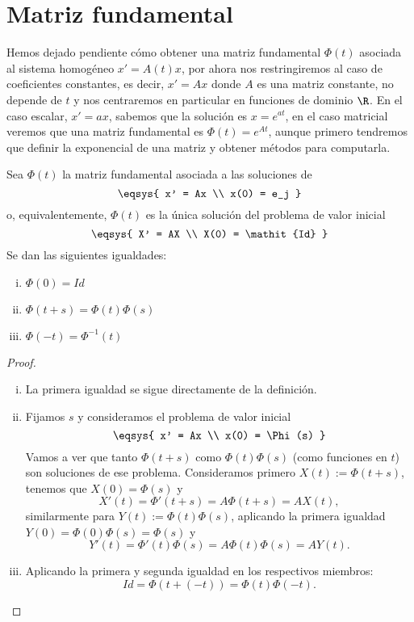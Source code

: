 \documentclass[../main.tex]{subfiles}
\begin{document}
\section{Matriz fundamental}

Hemos dejado pendiente cómo obtener una matriz fundamental \(\Phi(t)\) asociada
al sistema homogéneo \(x' = A(t)x\), por ahora nos restringiremos al caso de
coeficientes constantes, es decir, \(x' = Ax\) donde \(A\) es una matriz
constante, no depende de \(t\) y nos centraremos en particular en funciones de 
dominio \(\R\).  
En el caso escalar, \(x' = ax\), sabemos que la solución es 
\(x = e^{at}\), en el caso matricial veremos que una matriz fundamental es
\(\Phi(t) = e^{At}\), aunque primero tendremos que definir la exponencial de una
matriz y obtener métodos para computarla.

\begin{lemma}
\label{lem:expphi}
	Sea \(\Phi(t)\) la matriz fundamental asociada a las soluciones de
	\[\eqsys{
		x' = Ax \\
		x(0) = e_j
		}\]
	o, equivalentemente, \(\Phi(t)\) es la única solución del problema de valor
	inicial
	\[\eqsys{
		X' = AX \\
		X(0) = \mathit{Id}
		}\]
	Se dan las siguientes igualdades:
	\begin{multicols}{3}
	\begin{enumerate}[i)]
		\item \(\displaystyle \Phi(0) = \mathit{Id}\) 
		\item \(\displaystyle \Phi(t + s) = \Phi(t) \Phi(s)\) 
		\item \(\displaystyle \Phi(-t) = \Phi^{-1}(t)\) 
	\end{enumerate}
	\end{multicols}
\end{lemma}

\begin{proof}
	\begin{enumerate}[i), wide, labelwidth=0pt, labelindent=0pt]
		\item La primera igualdad se sigue directamente de la definición.
		\item Fijamos \(s\) y consideramos el problema de valor inicial
			\[\eqsys{ x' = Ax \\ x(0) = \Phi(s) }\]
			Vamos a ver que tanto \(\Phi(t + s)\) como \(\Phi(t)\Phi(s)\) (como
			funciones en \(t\)) son soluciones de ese problema. Consideramos
			primero \(X(t) := \Phi(t + s)\), tenemos que \(X(0) = \Phi(s)\) y
			\[X'(t) = \Phi'(t + s) = A \Phi(t + s) = A X(t),\]
			similarmente para \(Y(t) := \Phi(t)\Phi(s)\), aplicando la primera 
			igualdad \(Y(0) = \Phi(0)\Phi(s) = \Phi(s)\) y
			\[Y'(t) = \Phi'(t)\Phi(s) = A \Phi(t)\Phi(s) = A Y(t).\]
		\item Aplicando la primera y segunda igualdad en los respectivos
			miembros:
			\[\mathit{Id} = \Phi(t + (-t)) = \Phi(t)\Phi(-t).\]
	\end{enumerate}
\end{proof}
\end{document}
